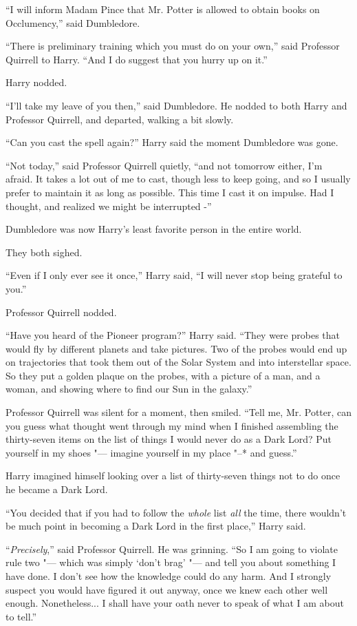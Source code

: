 ``I will inform Madam Pince that Mr. Potter is allowed to obtain books
on Occlumency,'' said Dumbledore.

``There is preliminary training which you must do on your own,'' said
Professor Quirrell to Harry. ``And I do suggest that you hurry up on
it.''

Harry nodded.

``I'll take my leave of you then,'' said Dumbledore. He nodded to both
Harry and Professor Quirrell, and departed, walking a bit slowly.

``Can you cast the spell again?'' Harry said the moment Dumbledore was
gone.

``Not today,'' said Professor Quirrell quietly, ``and not tomorrow
either, I'm afraid. It takes a lot out of me to cast, though less to
keep going, and so I usually prefer to maintain it as long as possible.
This time I cast it on impulse. Had I thought, and realized we might be
interrupted -''

Dumbledore was now Harry's least favorite person in the entire world.

They both sighed.

``Even if I only ever see it once,'' Harry said, ``I will never stop
being grateful to you.''

Professor Quirrell nodded.

``Have you heard of the Pioneer program?'' Harry said. ``They were
probes that would fly by different planets and take pictures. Two of the
probes would end up on trajectories that took them out of the Solar
System and into interstellar space. So they put a golden plaque on the
probes, with a picture of a man, and a woman, and showing where to find
our Sun in the galaxy.''

Professor Quirrell was silent for a moment, then smiled. ``Tell me, Mr.
Potter, can you guess what thought went through my mind when I finished
assembling the thirty-seven items on the list of things I would never do
as a Dark Lord? Put yourself in my shoes "--- imagine yourself in my place
"--* and guess.''

Harry imagined himself looking over a list of thirty-seven things not to
do once he became a Dark Lord.

``You decided that if you had to follow the \emph{whole} list \emph{all}
the time, there wouldn't be much point in becoming a Dark Lord in the
first place,'' Harry said.

``\emph{Precisely},'' said Professor Quirrell. He was grinning. ``So I am
going to violate rule two "--- which was simply `don't brag' "--- and tell you
about something I have done. I don't see how the knowledge could do any
harm. And I strongly suspect you would have figured it out anyway, once
we knew each other well enough. Nonetheless... I shall have your
oath never to speak of what I am about to tell.''

